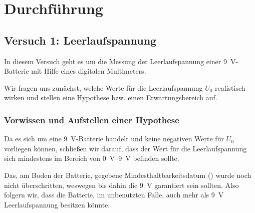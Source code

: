 \documentclass[11pt,a4paper,titlepage, ngerman]{article}
\begin{document}
	\newpage		
	\section{Durchführung}
		\label{Durchführung}
				
		\subsection{Versuch 1: Leerlaufspannung}
			\label{2.1}		
			In diesem Versuch geht es um die Messung der Leerlaufspannung einer \SI{9}{\V}-Batterie mit Hilfe eines digitalen Multimeters. 
			
			Wir fragen uns zunächst, welche Werte für die Leerlaufspannung $U_0$ realistisch wirken und stellen eine Hypothese bzw. einen Erwartungsbereich auf.
					
			\subsubsection{Vorwissen und Aufstellen einer Hypothese}
				\label{2.1.1}			
				Da es sich um eine \SI{9}{\V}-Batterie handelt und keine negativen Werte für $U_0$ vorliegen können, schließen wir darauf, dass der Wert für die Leerlaufspannung sich mindestens im Bereich von \SIrange{0}{9}{\V} befinden sollte.
				
				Das, am Boden der Batterie, gegebene Mindesthaltbarkeitsdatum (\grqq) wurde noch nicht überschritten, weswegen bis dahin die \SI{9}{\V} garantiert sein sollten. Also folgern wir, dass die Batterie, im unbenutzten Falle, auch mehr als \SI{9}{\V} Leerlaufspannung besitzen könnte.
				
\end{document}
